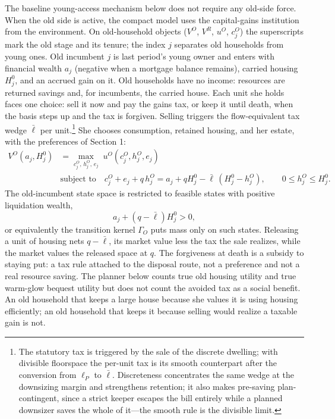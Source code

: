 \documentclass[11pt]{article}
\newcommand{\1}{\mathbf 1}
\begin{document}
The baseline young-access mechanism below does not require any old-side force. When the old side is active, the compact model uses the capital-gains institution from the environment. On old-household objects ($V^O$, $V^R$, $u^O$, $c_j^O$) the superscripts mark the old stage and its tenure; the index $j$ separates old households from young ones. Old incumbent $j$ is last period's young owner and enters with financial wealth $a_j$ (negative when a mortgage balance remains), carried housing $H_j^0$, and an accrued gain on it. Old households have no income: resources are returned savings and, for incumbents, the carried house. Each unit she holds faces one choice: sell it now and pay the gains tax, or keep it until death, when the basis steps up and the tax is forgiven. Selling triggers the flow-equivalent tax wedge $\bar\ell$ per unit.\footnote{The statutory tax is triggered by the sale of the discrete dwelling; with divisible floorspace the per-unit tax is its smooth counterpart after the conversion from $\ell_P$ to $\bar\ell$. Discreteness concentrates the same wedge at the downsizing margin and strengthens retention; it also makes pre-saving plan-contingent, since a strict keeper escapes the bill entirely while a planned downsizer saves the whole of it---the smooth rule is the divisible limit.} She chooses consumption, retained housing, and her estate, with the preferences of Section 1:
\begin{equation}
\begin{aligned}
V^O(a_j,H_j^0)
&=
\max_{c_j^O,\,h_j^O,\,e_j}\;
u^O(c_j^O,h_j^O,e_j)
\\
&\text{subject to}\quad
c_j^O+e_j+q\,h_j^O
=
a_j+q H_j^0-\bar\ell\,(H_j^0-h_j^O),
\qquad
0\le h_j^O\le H_j^0.
\end{aligned}
\label{eq:compact_old_budget}
\end{equation}
The old-incumbent state space is restricted to feasible states with positive liquidation wealth,
\[
a_j+(q-\bar\ell)H_j^0>0,
\]
or equivalently the transition kernel $\Gamma_O$ puts mass only on such states.
Releasing a unit of housing nets $q-\bar\ell$, its market value less the tax the sale realizes, while the market values the released space at $q$. The forgiveness at death is a subsidy to staying put: a tax rule attached to the disposal route, not a preference and not a real resource saving. The planner below counts true old housing utility and true warm-glow bequest utility but does not count the avoided tax as a social benefit. An old household that keeps a large house because she values it is using housing efficiently; an old household that keeps it because selling would realize a taxable gain is not.
\end{document}
